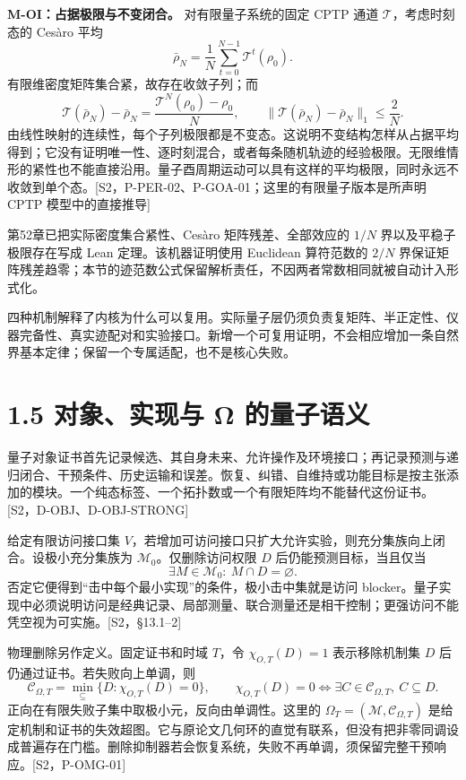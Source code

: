 \documentclass[
  11pt,
  oneside]{book}
\begin{document}
\textbf{M-OI：占据极限与不变闭合。} 对有限量子系统的固定 CPTP 通道
\(\mathcal T\)，考虑时刻态的 Cesàro 平均 \[
\bar\rho_N=\frac1N\sum_{t=0}^{N-1}\mathcal T^t(\rho_0).
\] 有限维密度矩阵集合紧，故存在收敛子列；而 \[
\mathcal T(\bar\rho_N)-\bar\rho_N=
\frac{\mathcal T^N(\rho_0)-\rho_0}{N},\qquad
\|\mathcal T(\bar\rho_N)-\bar\rho_N\|_1\le\frac2N.
\]
由线性映射的连续性，每个子列极限都是不变态。这说明不变结构怎样从占据平均得到；它没有证明唯一性、逐时刻混合，或者每条随机轨迹的经验极限。无限维情形的紧性也不能直接沿用。量子酉周期运动可以具有这样的平均极限，同时永远不收敛到单个态。{[}S2，P-PER-02、P-GOA-01；这里的有限量子版本是所声明
CPTP 模型中的直接推导{]}

第52章已把实际密度集合紧性、Cesàro 矩阵残差、全部效应的 \(1/N\)
界以及平稳子极限存在写成 Lean 定理。该机器证明使用 Euclidean 算符范数的
\(2/N\)
界保证矩阵残差趋零；本节的迹范数公式保留解析责任，不因两者常数相同就被自动计入形式化。

四种机制解释了内核为什么可以复用。实际量子层仍须负责复矩阵、半正定性、仪器完备性、真实迹配对和实验接口。新增一个可复用证明，不会相应增加一条自然界基本定律；保留一个专属适配，也不是核心失败。

\section{1.5 对象、实现与 Ω 的量子语义}

量子对象证书首先记录候选、其自身未来、允许操作及环境接口；再记录预测与递归闭合、干预条件、历史运输和误差。恢复、纠错、自维持或功能目标是按主张添加的模块。一个纯态标签、一个拓扑数或一个有限矩阵均不能替代这份证书。{[}S2，D-OBJ、D-OBJ-STRONG{]}

给定有限访问接口集
\(V\)，若增加可访问接口只扩大允许实验，则充分集族向上闭合。设极小充分集族为
\(\mathcal M_0\)。仅删除访问权限 \(D\) 后仍能预测目标，当且仅当 \[
\exists M\in\mathcal M_0:\ M\cap D=\varnothing.
\] 否定它便得到``击中每个最小实现''的条件，极小击中集就是访问
blocker。量子实现中必须说明访问是经典记录、局部测量、联合测量还是相干控制；更强访问不能凭空视为可实施。{[}S2，§13.1--2{]}

物理删除另作定义。固定证书和时域 \(T\)，令 \(\chi_{O,T}(D)=1\)
表示移除机制集 \(D\) 后仍通过证书。若失败向上单调，则 \[
\mathcal C_{\Omega,T}=\min_{\subseteq}\{D:\chi_{O,T}(D)=0\},\qquad
\chi_{O,T}(D)=0\iff\exists C\in\mathcal C_{\Omega,T},\ C\subseteq D.
\] 正向在有限失败子集中取极小元，反向由单调性。这里的
\(\Omega_T=(\mathcal M,\mathcal C_{\Omega,T})\)
是给定机制和证书的失效超图。它与原论文几何环的直觉有联系，但没有把非零同调设成普遍存在门槛。删除抑制器若会恢复系统，失败不再单调，须保留完整干预响应。{[}S2，P-OMG-01{]}
\end{document}

